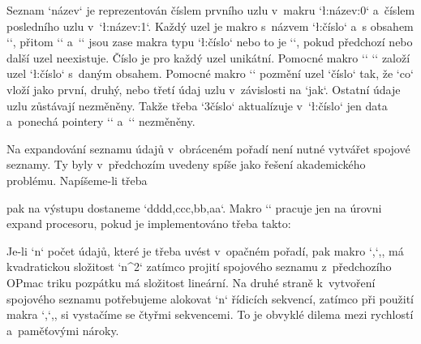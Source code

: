 \def\printlist#1{\expandafter\ifx\csname l:#1:0\endcsname \relax \else 
   \expandafter\expandafter\expandafter\printlistA 
      \csname l:\csname l:#1:0\endcsname\expandafter\endcsname \fi} 
\def\printlistA#1#2#3{#3\ifx#2\relax \else \listsep 
   \expandafter\expandafter\expandafter\printlistA\expandafter#2\fi} 
 
\def\printlistrev#1{\expandafter\ifx\csname l:#1:1\endcsname \relax \else 
   \expandafter\expandafter\expandafter\printlistAr 
      \csname l:\csname l:#1:1\endcsname\expandafter\endcsname \fi} 
\def\printlistAr#1#2#3{#3\ifx#1\relax \else \listsep 
   \expandafter\expandafter\expandafter\printlistAr\expandafter#1\fi} 
 
\def\listsep{;} 
\endtt


Seznam `název` je reprezentován číslem prvního uzlu v~makru `\l:název:0` a~číslem posledního uzlu v~`\l:název:1`. Každý uzel je makro s~názvem `\l:číslo` a~s obsahem `{ }`, přitom `` a~`` jsou zase makra typu `\l:číslo` nebo to je `\relax`, pokud předchozí nebo další uzel neexistuje. Číslo je pro každý uzel unikátní. Pomocné makro `\setlistnode` `` založí uzel `\l:číslo` s~daným obsahem. Pomocné makro `` pozmění uzel `číslo` tak, že `co` vloží jako první, druhý, nebo třetí údaj uzlu v~závislosti na `jak`. Ostatní údaje uzlu zůstávají nezměněny. Takže třeba `3{číslo}` aktualízuje v~`\l:číslo` jen data a~ponechá pointery `` a~`` nezměněny. 


 


Na expandování seznamu údajů v~obráceném pořadí není nutné vytvářet spojové seznamy. Ty byly v~předchozím  uvedeny spíše jako řešení akademického problému. Napíšeme-li třeba 

\begtt
{} 
\endtt


pak na výstupu dostaneme `dddd,ccc,bb,aa`. Makro `\revlist` pracuje jen na úrovni expand procesoru, pokud je implementováno třeba takto: 

\begtt
\def\revlist#1{\revlistA{}#1,,} 
\def\revlistA#1#2,{\ifx,#2,\expandafter\revlistB\else \expandafter\revlistA\fi {#2,#1}} 
\def\revlistB#1{\revlistC #1,} 
\def\revlistC,#1,,{#1} 
\endtt


Je-li `n` počet údajů, které je třeba uvést v~opačném pořadí, pak makro `\revlist` má kvadratickou složitost `n^2` zatímco projití spojového seznamu z~předchozího OPmac triku pozpátku má složitost lineární. Na druhé straně k~vytvoření spojového seznamu potřebujeme alokovat `n` řídicích sekvencí, zatímco při použití makra `\revlist` si vystačíme se čtyřmi sekvencemi. To je obvyklé dilema mezi rychlostí a~paměťovými nároky. 


